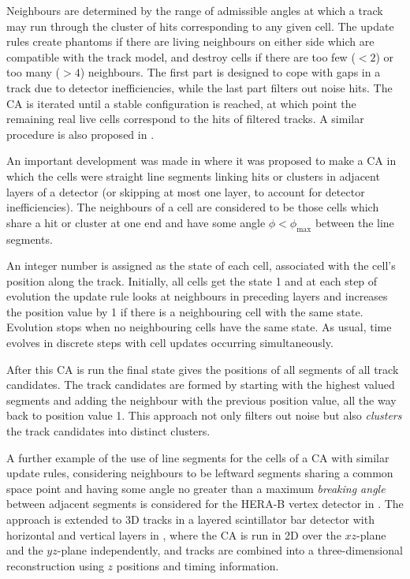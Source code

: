 Neighbours are determined by the range of admissible angles at which a track may run through the cluster of hits corresponding to any given cell. The update rules create phantoms if there are living neighbours on either side which are compatible with the track model, and destroy cells if there are too few ($< 2$) or too many ($> 4$) neighbours. The first part is designed to cope with gaps in a track due to detector inefficiencies, while the last part filters out noise hits. The \ac{CA} is iterated until a stable configuration is reached, at which point the remaining real live cells correspond to the hits of filtered tracks. A similar procedure is also proposed in \citep{Casolino1995}.

An important development was made in \citep{Kisel1997} where it was proposed to make a \ac{CA} in which the cells were straight line segments linking hits or clusters in adjacent layers of a detector (or skipping at most one layer, to account for detector inefficiencies). The neighbours of a cell are considered to be those cells which share a hit or cluster at one end and have some angle $\phi < \phi_\mathrm{max}$ between the line segments.

An integer number is assigned as the state of each cell, associated with the cell's position along the track. Initially, all cells get the state 1 and at each step of evolution the update rule looks at neighbours in preceding layers and increases the position value by 1 if there is a neighbouring cell with the same state. Evolution stops when no neighbouring cells have the same state. As usual, time evolves in discrete steps with cell updates occurring simultaneously.

After this \ac{CA} is run the final state gives the positions of all segments of all track candidates. The track candidates are formed by starting with the highest valued segments and adding the neighbour with the previous position value, all the way back to position value 1. This approach not only filters out noise but also \emph{clusters} the track candidates into distinct clusters.

A further example of the use of line segments for the cells of a \ac{CA} with similar update rules, considering neighbours to be leftward segments sharing a common space point and having some angle no greater than a maximum \emph{breaking angle} between adjacent segments is considered for the HERA-B vertex detector in \citep{Abt2002}. The approach is extended to 3D tracks in a layered scintillator bar detector with horizontal and vertical layers in \citep{Maesaka2005}, where the \ac{CA} is run in 2D over the $xz$-plane and the $yz$-plane independently, and tracks are combined into a three-dimensional reconstruction using $z$ positions and timing information.

